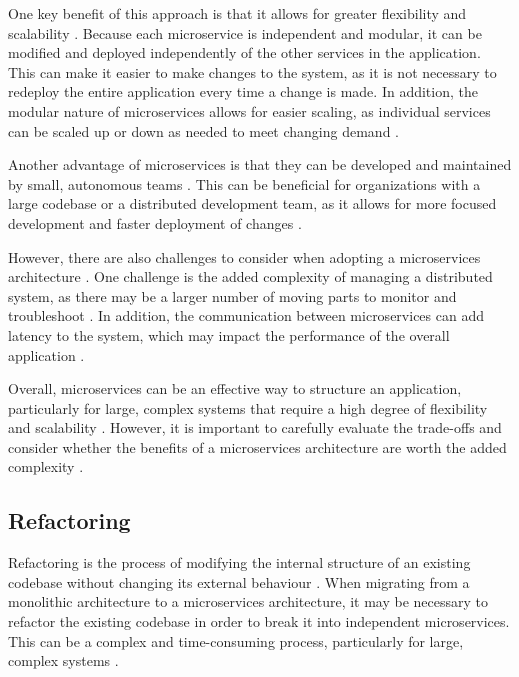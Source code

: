\documentclass[conference]{IEEEtran}
\begin{document}
One key benefit of this approach is that it allows for greater flexibility and
scalability \cite{newman2019monolith}. Because each microservice is independent
and modular, it can be modified and deployed independently of the other
services in the application. This can make it easier to make changes to the
system, as it is not necessary to redeploy the entire application every time a
change is made. In addition, the modular nature of microservices allows for
easier scaling, as individual services can be scaled up or down as needed to
meet changing demand
\cite{newman2019monolith,newman2021building,fowler-microservices}.

Another advantage of microservices is that they can be developed and maintained
by small, autonomous teams \cite{chen2018microservices}. This can be beneficial
for organizations with a large codebase or a distributed development team, as
it allows for more focused development and faster deployment of changes
\cite{nadareishvili2016microservice}.

However, there are also challenges to consider when adopting a microservices
architecture \cite{fowler-microservices-tradeoffs}. One challenge is the added
complexity of managing a distributed system, as there may be a larger number of
moving parts to monitor and troubleshoot \cite{newman2021building}. In
addition, the communication between microservices can add latency to the
system, which may impact the performance of the overall application
\cite{fowler-microservices-tradeoffs,pautasso2017microservices}.

Overall, microservices can be an effective way to structure an application,
particularly for large, complex systems that require a high degree of
flexibility and scalability \cite{newman2021building}. However, it is important
to carefully evaluate the trade-offs and consider whether the benefits of a
microservices architecture are worth the added complexity
\cite{fowler-microservices-tradeoffs}.

\subsection{Refactoring}

Refactoring is the process of modifying the internal structure of an existing
codebase without changing its external behaviour \cite{becker1999refactoring}.
When migrating from a monolithic architecture to a microservices architecture,
it may be necessary to refactor the existing codebase in order to break it into
independent microservices. This can be a complex and time-consuming process,
particularly for large, complex systems \cite{newman2019monolith}.
\end{document}
